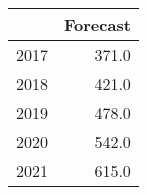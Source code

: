 \begin{tabular}{lr}
\toprule
{} &  Forecast \\
\midrule
2017 &     371.0 \\
2018 &     421.0 \\
2019 &     478.0 \\
2020 &     542.0 \\
2021 &     615.0 \\
\bottomrule
\end{tabular}
